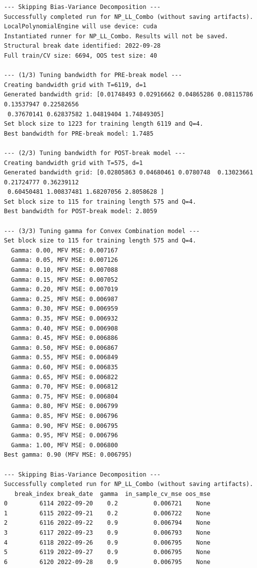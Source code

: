 \documentclass[
  letterpaper,
  DIV=11,
  numbers=noendperiod]{scrartcl}
\begin{document}
\begin{verbatim}
--- Skipping Bias-Variance Decomposition ---
Successfully completed run for NP_LL_Combo (without saving artifacts).
LocalPolynomialEngine will use device: cuda
Instantiated runner for NP_LL_Combo. Results will not be saved.
Structural break date identified: 2022-09-28
Full train/CV size: 6694, OOS test size: 40

--- (1/3) Tuning bandwidth for PRE-break model ---
Creating bandwidth grid with T=6119, d=1
Generated bandwidth grid: [0.01748493 0.02916662 0.04865286 0.08115786 0.13537947 0.22582656
 0.37670141 0.62837582 1.04819404 1.74849305]
Set block size to 1223 for training length 6119 and Q=4.
Best bandwidth for PRE-break model: 1.7485

--- (2/3) Tuning bandwidth for POST-break model ---
Creating bandwidth grid with T=575, d=1
Generated bandwidth grid: [0.02805863 0.04680461 0.0780748  0.13023661 0.21724777 0.36239112
 0.60450481 1.00837481 1.68207056 2.8058628 ]
Set block size to 115 for training length 575 and Q=4.
Best bandwidth for POST-break model: 2.8059

--- (3/3) Tuning gamma for Convex Combination model ---
Set block size to 115 for training length 575 and Q=4.
  Gamma: 0.00, MFV MSE: 0.007167
  Gamma: 0.05, MFV MSE: 0.007126
  Gamma: 0.10, MFV MSE: 0.007088
  Gamma: 0.15, MFV MSE: 0.007052
  Gamma: 0.20, MFV MSE: 0.007019
  Gamma: 0.25, MFV MSE: 0.006987
  Gamma: 0.30, MFV MSE: 0.006959
  Gamma: 0.35, MFV MSE: 0.006932
  Gamma: 0.40, MFV MSE: 0.006908
  Gamma: 0.45, MFV MSE: 0.006886
  Gamma: 0.50, MFV MSE: 0.006867
  Gamma: 0.55, MFV MSE: 0.006849
  Gamma: 0.60, MFV MSE: 0.006835
  Gamma: 0.65, MFV MSE: 0.006822
  Gamma: 0.70, MFV MSE: 0.006812
  Gamma: 0.75, MFV MSE: 0.006804
  Gamma: 0.80, MFV MSE: 0.006799
  Gamma: 0.85, MFV MSE: 0.006796
  Gamma: 0.90, MFV MSE: 0.006795
  Gamma: 0.95, MFV MSE: 0.006796
  Gamma: 1.00, MFV MSE: 0.006800
Best gamma: 0.90 (MFV MSE: 0.006795)

--- Skipping Bias-Variance Decomposition ---
Successfully completed run for NP_LL_Combo (without saving artifacts).
   break_index break_date  gamma  in_sample_cv_mse oos_mse
0         6114 2022-09-20    0.2          0.006721    None
1         6115 2022-09-21    0.2          0.006722    None
2         6116 2022-09-22    0.9          0.006794    None
3         6117 2022-09-23    0.9          0.006793    None
4         6118 2022-09-26    0.9          0.006795    None
5         6119 2022-09-27    0.9          0.006795    None
6         6120 2022-09-28    0.9          0.006795    None
\end{verbatim}
\end{document}
